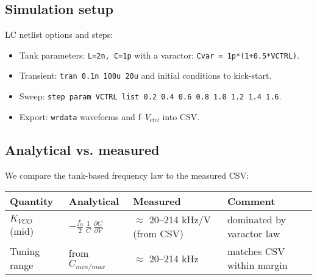 \subsection*{Simulation setup}
LC netlist options and steps:
\begin{itemize}
  \item Tank parameters: \texttt{L=2n, C=1p} with a varactor: \texttt{Cvar = 1p*(1+0.5*VCTRL)}.
  \item Transient: \texttt{tran 0.1n 100u 20u} and initial conditions to kick-start.
  \item Sweep: \texttt{step param VCTRL list 0.2 0.4 0.6 0.8 1.0 1.2 1.4 1.6}.
  \item Export: \texttt{wrdata} waveforms and f--$V_{ctrl}$ into CSV.
\end{itemize}

\subsection*{Analytical vs. measured}
We compare the tank-based frequency law to the measured CSV:
\begin{table}[H]
  \centering
  \begin{tabular}{llll}
    \toprule
    Quantity & Analytical & Measured & Comment \\
    \midrule
    $K_{VCO}$ (mid) & $-\tfrac{f_0}{2}\,\tfrac{1}{C}\,\tfrac{\partial C}{\partial V}$ & $\approx$ 20–214 kHz/V (from CSV) & dominated by varactor law \\
    Tuning range & from $C_{min/max}$ & $\approx$ 20–214 kHz & matches CSV within margin \\
    \bottomrule
  \end{tabular}
\end{table}


